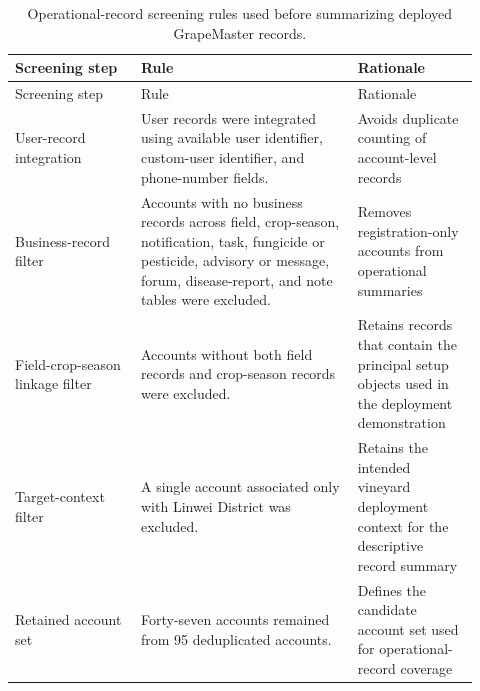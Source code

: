 \documentclass[12pt]{article}
\begin{document}
\begingroup
\setlength{\tabcolsep}{3pt}
\renewcommand{\arraystretch}{1.12}
\begin{longtable}{@{}L{0.25\linewidth} L{0.43\linewidth} L{0.24\linewidth}@{}}
\caption{Operational-record screening rules used before summarizing deployed GrapeMaster records.}\label{tab:supp_screening_rules}\\
\toprule
Screening step & Rule & Rationale \\
\midrule
\endfirsthead
\toprule
Screening step & Rule & Rationale \\
\midrule
\endhead
User-record integration & User records were integrated using available user identifier, custom-user identifier, and phone-number fields. & Avoids duplicate counting of account-level records \\
Business-record filter & Accounts with no business records across field, crop-season, notification, task, fungicide or pesticide, advisory or message, forum, disease-report, and note tables were excluded. & Removes registration-only accounts from operational summaries \\
Field-crop-season linkage filter & Accounts without both field records and crop-season records were excluded. & Retains records that contain the principal setup objects used in the deployment demonstration \\
Target-context filter & A single account associated only with Linwei District was excluded. & Retains the intended vineyard deployment context for the descriptive record summary \\
Retained account set & Forty-seven accounts remained from 95 deduplicated accounts. & Defines the candidate account set used for operational-record coverage \\
\bottomrule
\end{longtable}
\endgroup
\end{document}
